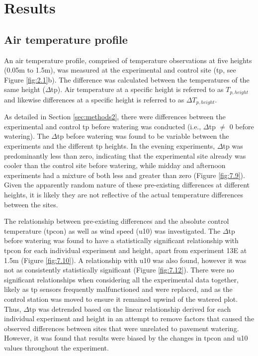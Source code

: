 \documentclass[final,3p,times,authoryear]{elsarticle}
\begin{document}
\section{Results}\label{sec:discussion3}
\subsection{Air temperature profile}\label{sec:discussion3.1}

An air temperature profile, comprised of temperature observations at five heights (0.05m to 1.5m), was measured at the experimental and control site (\gls{tp}, see Figure \ref{fig:2.1}b). The difference was calculated between the temperatures of the same height ($\Delta$\gls{tp}). Air temperature at a specific height is referred to as $T_{p,height}$ and likewise differences at a specific height is referred to as $\Delta$$T_{p,height}$.

As detailed in Section \ref{sec:methods2}, there were differences between the experimental and control \gls{tp} before watering was conducted (i.e., $\Delta$\gls{tp} $\neq$ 0 before watering). The $\Delta$\gls{tp} before watering was found to be variable between the experiments and the different \gls{tp} heights. In the evening experiments, $\Delta$\gls{tp} was predominantly less than zero, indicating that the experimental site already was cooler than the control site before watering, while midday and afternoon experiments had a mixture of both less and greater than zero (Figure \ref{fig:7.9}). Given the apparently random nature of these pre-existing differences at different heights, it is likely they are not reflective of the actual temperature differences between the sites.

The relationship between pre-existing differences and the absolute control temperature (\gls{tpcon}) as well as wind speed (\gls{u10}) was investigated. The $\Delta$\gls{tp} before watering was found to have a statistically significant relationship with \gls{tpcon} for each individual experiment and height, apart from experiment 13E at 1.5m (Figure \ref{fig:7.10}). A relationship with \gls{u10} was also found, however it was not as consistently statistically significant (Figure \ref{fig:7.12}). There were no significant relationships when considering all the experimental data together, likely as \gls{tp} sensors frequently malfunctioned and were replaced, and as the control station was moved to ensure it remained upwind of the watered plot. Thus, $\Delta$\gls{tp} was detrended based on the linear relationship derived for each individual experiment and height in an attempt to remove factors that caused the observed differences between sites that were unrelated to pavement watering. However, it was found that results were biased by the changes in \gls{tpcon} and \gls{u10} values throughout the experiment.
\end{document}
